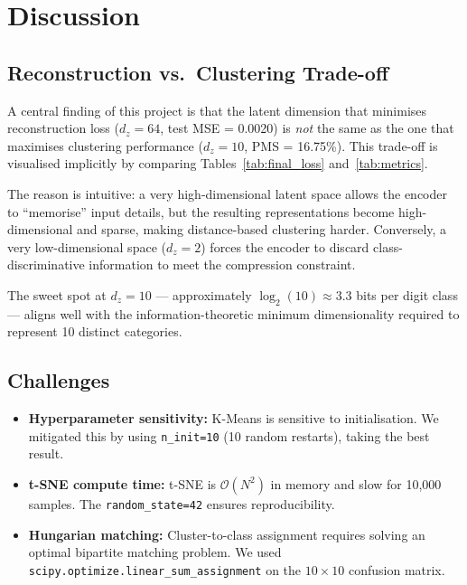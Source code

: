 \documentclass[12pt,a4paper]{article}
\begin{document}
\section{Discussion}

\subsection{Reconstruction vs.\ Clustering Trade-off}

A central finding of this project is that the latent dimension that minimises reconstruction loss ($d_z = 64$, test MSE = 0.0020) is \emph{not} the same as the one that maximises clustering performance ($d_z = 10$, PMS = 16.75\%). This trade-off is visualised implicitly by comparing Tables~\ref{tab:final_loss} and~\ref{tab:metrics}.

The reason is intuitive: a very high-dimensional latent space allows the encoder to ``memorise'' input details, but the resulting representations become high-dimensional and sparse, making distance-based clustering harder. Conversely, a very low-dimensional space ($d_z = 2$) forces the encoder to discard class-discriminative information to meet the compression constraint.

The sweet spot at $d_z = 10$ — approximately $\log_2(10) \approx 3.3$ bits per digit class — aligns well with the information-theoretic minimum dimensionality required to represent 10 distinct categories.

\subsection{Challenges}

\begin{itemize}
  \item \textbf{Hyperparameter sensitivity:} K-Means is sensitive to initialisation. We mitigated this by using \texttt{n\_init=10} (10 random restarts), taking the best result.
  \item \textbf{t-SNE compute time:} t-SNE is $\mathcal{O}(N^2)$ in memory and slow for 10,000 samples. The \texttt{random\_state=42} ensures reproducibility.
  \item \textbf{Hungarian matching:} Cluster-to-class assignment requires solving an optimal bipartite matching problem. We used \texttt{scipy.optimize.linear\_sum\_assignment} on the $10\times10$ confusion matrix.
\end{itemize}

\end{document}
